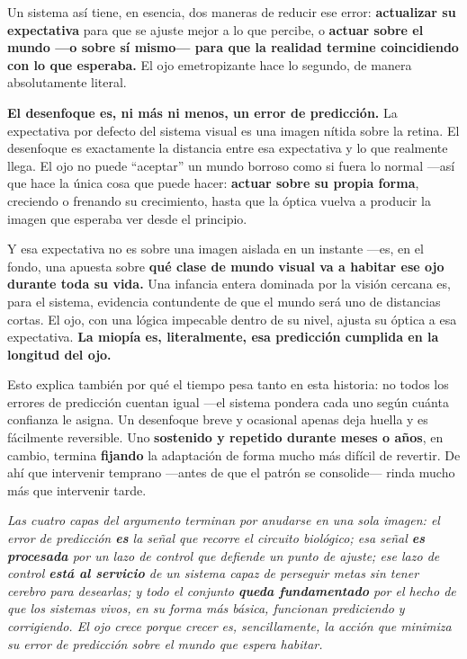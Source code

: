 \documentclass[10pt,a4paper]{article}
\providecommand{\enquote}[1]{``#1''}
\newcommand{\thesisquote}[1]{%
\par\medskip
\begingroup
\begin{center}
\begin{minipage}{0.86\linewidth}
\itshape\small #1
\end{minipage}
\end{center}
\endgroup
\medskip}
\begin{document}
Un sistema as\'i tiene, en esencia, dos maneras de reducir ese error: \textbf{actualizar su expectativa} para que se ajuste mejor a lo que percibe, o \textbf{actuar sobre el mundo ---o sobre s\'i mismo--- para que la realidad termine coincidiendo con lo que esperaba.} El ojo emetropizante hace lo segundo, de manera absolutamente literal.

\textbf{El desenfoque es, ni m\'as ni menos, un error de predicci\'on.} La expectativa por defecto del sistema visual es una imagen n\'itida sobre la retina. El desenfoque es exactamente la distancia entre esa expectativa y lo que realmente llega. El ojo no puede \enquote{aceptar} un mundo borroso como si fuera lo normal ---as\'i que hace la \'unica cosa que puede hacer: \textbf{actuar sobre su propia forma}, creciendo o frenando su crecimiento, hasta que la \'optica vuelva a producir la imagen que esperaba ver desde el principio.

Y esa expectativa no es sobre una imagen aislada en un instante ---es, en el fondo, una apuesta sobre \textbf{qu\'e clase de mundo visual va a habitar ese ojo durante toda su vida.} Una infancia entera dominada por la visi\'on cercana es, para el sistema, evidencia contundente de que el mundo ser\'a uno de distancias cortas. El ojo, con una l\'ogica impecable dentro de su nivel, ajusta su \'optica a esa expectativa. \textbf{La miop\'ia es, literalmente, esa predicci\'on cumplida en la longitud del ojo.}

Esto explica tambi\'en por qu\'e el tiempo pesa tanto en esta historia: no todos los errores de predicci\'on cuentan igual ---el sistema pondera cada uno seg\'un cu\'anta confianza le asigna. Un desenfoque breve y ocasional apenas deja huella y es f\'acilmente reversible. Uno \textbf{sostenido y repetido durante meses o a\~nos}, en cambio, termina \textbf{fijando} la adaptaci\'on de forma mucho m\'as dif\'icil de revertir. De ah\'i que intervenir temprano ---antes de que el patr\'on se consolide--- rinda mucho m\'as que intervenir tarde.

\thesisquote{Las cuatro capas del argumento terminan por anudarse en una sola imagen: el error de predicci\'on \textbf{es} la se\~nal que recorre el circuito biol\'ogico; esa se\~nal \textbf{es procesada} por un lazo de control que defiende un punto de ajuste; ese lazo de control \textbf{est\'a al servicio} de un sistema capaz de perseguir metas sin tener cerebro para desearlas; y todo el conjunto \textbf{queda fundamentado} por el hecho de que los sistemas vivos, en su forma m\'as b\'asica, funcionan prediciendo y corrigiendo. El ojo crece porque crecer es, sencillamente, la acci\'on que minimiza su error de predicci\'on sobre el mundo que espera habitar.}
\end{document}
